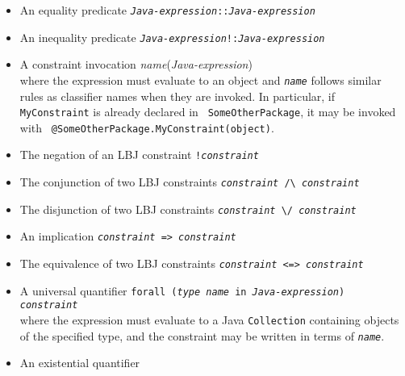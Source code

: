 \vspace{-.2cm}
\begin{itemize}
\item An equality predicate \hspace{.05cm}
      {\tt\emph{Java-expression}\hspace{.1cm}::\hspace{.1cm}\emph{Java-expression}}
\item An inequality predicate \hspace{.05cm}
      {\tt\emph{Java-expression}\hspace{.1cm}!:\hspace{.1cm}\emph{Java-expression}}
\item A constraint invocation \hspace{.05cm}
      {\tt@\emph{name}(\emph{Java-expression})} \\
      where the expression must evaluate to an object and {\tt\emph{name}}
      follows similar rules as classifier names when they are invoked.  In
      particular, if {\tt MyConstraint} is already declared in {\tt
      SomeOtherPackage}, it may be invoked with {\tt
      @SomeOtherPackage.MyConstraint(object)}.
\item The negation of an LBJ constraint \hspace{.05cm}
      {\tt !\emph{constraint}}
\item The conjunction of two LBJ constraints \hspace{.05cm}
      {\tt\emph{constraint} \verb|/\| \emph{constraint}}
\item The disjunction of two LBJ constraints \hspace{.05cm}
      {\tt\emph{constraint} \verb|\/| \emph{constraint}}
\item An implication \hspace{.05cm}
      {\tt\emph{constraint} => \emph{constraint}}
\item The equivalence of two LBJ constraints \hspace{.05cm}
      {\tt\emph{constraint} <=> \emph{constraint}}
\item A universal quantifier \hspace{.05cm}
      {\tt forall (\emph{type name} in \emph{Java-expression})
        \emph{constraint}} \\
      where the expression must evaluate to a Java {\tt Collection} containing
      objects of the specified type, and the constraint may be written in
      terms of {\tt\emph{name}}.
\item An existential quantifier \hspace{.05cm}

\end{itemize}
